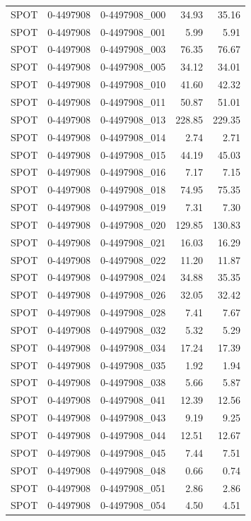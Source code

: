 \begin{tabular}{lllrr}
SPOT & 0-4497908 & 0-4497908_000 & 34.93 & 35.16 \\
SPOT & 0-4497908 & 0-4497908_001 & 5.99 & 5.91 \\
SPOT & 0-4497908 & 0-4497908_003 & 76.35 & 76.67 \\
SPOT & 0-4497908 & 0-4497908_005 & 34.12 & 34.01 \\
SPOT & 0-4497908 & 0-4497908_010 & 41.60 & 42.32 \\
SPOT & 0-4497908 & 0-4497908_011 & 50.87 & 51.01 \\
SPOT & 0-4497908 & 0-4497908_013 & 228.85 & 229.35 \\
SPOT & 0-4497908 & 0-4497908_014 & 2.74 & 2.71 \\
SPOT & 0-4497908 & 0-4497908_015 & 44.19 & 45.03 \\
SPOT & 0-4497908 & 0-4497908_016 & 7.17 & 7.15 \\
SPOT & 0-4497908 & 0-4497908_018 & 74.95 & 75.35 \\
SPOT & 0-4497908 & 0-4497908_019 & 7.31 & 7.30 \\
SPOT & 0-4497908 & 0-4497908_020 & 129.85 & 130.83 \\
SPOT & 0-4497908 & 0-4497908_021 & 16.03 & 16.29 \\
SPOT & 0-4497908 & 0-4497908_022 & 11.20 & 11.87 \\
SPOT & 0-4497908 & 0-4497908_024 & 34.88 & 35.35 \\
SPOT & 0-4497908 & 0-4497908_026 & 32.05 & 32.42 \\
SPOT & 0-4497908 & 0-4497908_028 & 7.41 & 7.67 \\
SPOT & 0-4497908 & 0-4497908_032 & 5.32 & 5.29 \\
SPOT & 0-4497908 & 0-4497908_034 & 17.24 & 17.39 \\
SPOT & 0-4497908 & 0-4497908_035 & 1.92 & 1.94 \\
SPOT & 0-4497908 & 0-4497908_038 & 5.66 & 5.87 \\
SPOT & 0-4497908 & 0-4497908_041 & 12.39 & 12.56 \\
SPOT & 0-4497908 & 0-4497908_043 & 9.19 & 9.25 \\
SPOT & 0-4497908 & 0-4497908_044 & 12.51 & 12.67 \\
SPOT & 0-4497908 & 0-4497908_045 & 7.44 & 7.51 \\
SPOT & 0-4497908 & 0-4497908_048 & 0.66 & 0.74 \\
SPOT & 0-4497908 & 0-4497908_051 & 2.86 & 2.86 \\
SPOT & 0-4497908 & 0-4497908_054 & 4.50 & 4.51 \\

\end{tabular}
